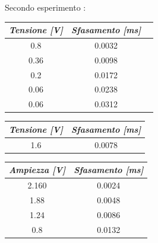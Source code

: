     Secondo esperimento : \par
    \begin{table} [!ht]
        \begin{minipage}{.34\linewidth}
            \centering
            \begin{tabular}{|c|c|c|}
                \hline
                \textit{Tensione [V]} & \textit{Sfasamento [ms]} \\
                \hline
                0.8 & 0.0032 \\
                \hline
                0.36 & 0.0098 \\
                \hline
                0.2 & 0.0172 \\
                \hline
                0.06 & 0.0238 \\
                \hline
                0.06 & 0.0312 \\
                \hline
            \end{tabular}
        \end{minipage}
        \begin{minipage}{.34\linewidth}
            \centering
            \begin{tabular}{|c|c|}
                \hline
                \textit{Tensione [V]} & \textit{Sfasamento [ms]} \\
                \hline
                1.6 & 0.0078 \\            
                \hline
            \end{tabular}
        \end{minipage}
        \begin{minipage}{.34\linewidth}
            \centering
            \begin{tabular}{|c|c|}
                \hline
                \textit{Ampiezza [V]} & \textit{Sfasamento [ms]} \\
                \hline
                2.160 & 0.0024 \\
                \hline
                1.88 & 0.0048 \\
                \hline
                1.24 & 0.0086 \\
                \hline
                0.8 & 0.0132 \\            
                \hline
            \end{tabular}
        \end{minipage}
    \end{table}


